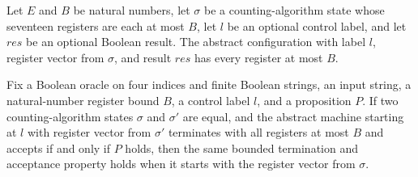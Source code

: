 \begin{lemma}
\label{Complexity.LogProg.ISGen.St.greg}
\leanok
{}
Let $E$ and $B$ be natural numbers, let $\sigma$ be a counting-algorithm state whose
seventeen registers are each at most $B$, let $l$ be an optional control label, and let
$res$ be an optional Boolean result. The abstract configuration with label $l$, register
vector from $\sigma$, and result $res$ has every register at most $B$.
\end{lemma}

\begin{lemma}
\label{Complexity.LogProg.ISGen.IG.of_eq}
\leanok
{}
Fix a Boolean oracle on four indices and finite Boolean strings, an input string, a
natural-number register bound $B$, a control label $l$, and a proposition $P$. If two
counting-algorithm states $\sigma$ and $\sigma'$ are equal, and the abstract machine
starting at $l$ with register vector from $\sigma'$ terminates with all registers at
most $B$ and accepts if and only if $P$ holds, then the same bounded termination and
acceptance property holds when it starts with the register vector from $\sigma$.
\end{lemma}
